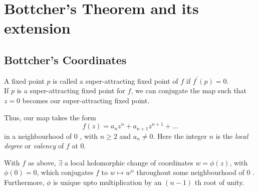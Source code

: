 \chapter{Bottcher's Theorem and its extension}
\section{Bottcher's Coordinates}
A fixed point $p$ is called a super-attracting fixed point of $f$ if $f^{\prime}\left(p\right)=0$.\\
If $p$ is a super-attracting fixed point for $f$, we can conjugate the map such that $z=0$ becomes our super-attracting fixed point.

Thus, our map takes the form $$f(z)=a_{n} z^{n}+a_{n+1} z^{n+1}+\ldots$$ in a neighbourhood of 0 , with $n \geq 2$ and $a_{n} \neq 0$. Here the integer $n$ is the \emph{local degree} or \emph{valency} of \( f \) at \( 0 \).

\begin{theorem}
	With $f$ as above, $\exists$ a local holomorphic change of coordinates $w=\phi(z)$, with $\phi(0)=0$, which conjugates $f$ to $w \mapsto w^{n}$ throughout some neighbourhood of 0 .\\
Furthermore, $\phi$ is unique upto multiplication by an $(n-1)$ th root of unity.
\end{theorem}

